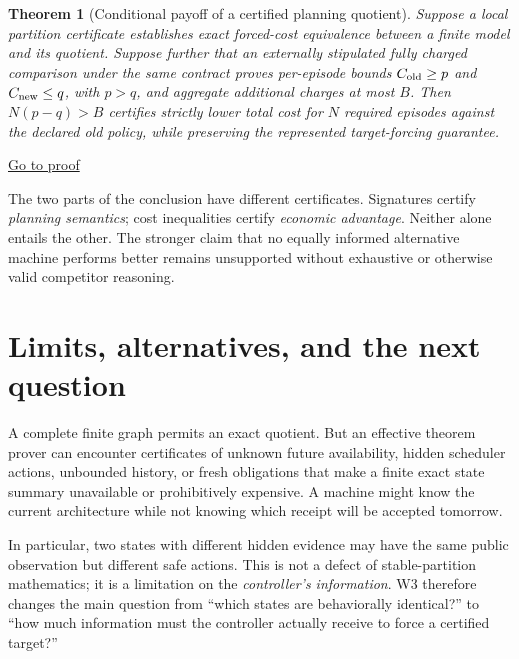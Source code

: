 \documentclass[11pt,letterpaper]{article}
\newtheorem{theorem}{Theorem}[section]
\theoremstyle{definition}
\theoremstyle{remark}
\newcommand{\backproof}[1]{\hfill\hyperlink{proof:#1}{\footnotesize Go to proof}}
\begin{document}
\begin{theorem}[Conditional payoff of a certified planning quotient]\label{thm:payoff}\hypertarget{stmt:payoff}{}
Suppose a local partition certificate establishes exact forced-cost equivalence between a finite model and its quotient. Suppose further that an externally stipulated fully charged comparison under the \emph{same} contract proves per-episode bounds $C_{\rm old}\ge p$ and $C_{\rm new}\le q$, with $p>q$, and aggregate additional charges at most $B$. Then $N(p-q)>B$ certifies strictly lower total cost for $N$ required episodes against the declared old policy, while preserving the represented target-forcing guarantee.
\end{theorem}\backproof{payoff}

The two parts of the conclusion have different certificates. Signatures certify \emph{planning semantics}; cost inequalities certify \emph{economic advantage}. Neither alone entails the other. The stronger claim that no equally informed alternative machine performs better remains unsupported without exhaustive or otherwise valid competitor reasoning.

\section{Limits, alternatives, and the next question}
A complete finite graph permits an exact quotient. But an effective theorem prover can encounter certificates of unknown future availability, hidden scheduler actions, unbounded history, or fresh obligations that make a finite exact state summary unavailable or prohibitively expensive. A machine might know the current architecture while not knowing which receipt will be accepted tomorrow.

In particular, two states with different hidden evidence may have the same public observation but different safe actions. This is not a defect of stable-partition mathematics; it is a limitation on the \emph{controller's information}. W3 therefore changes the main question from ``which states are behaviorally identical?'' to ``how much information must the controller actually receive to force a certified target?''
\end{document}
